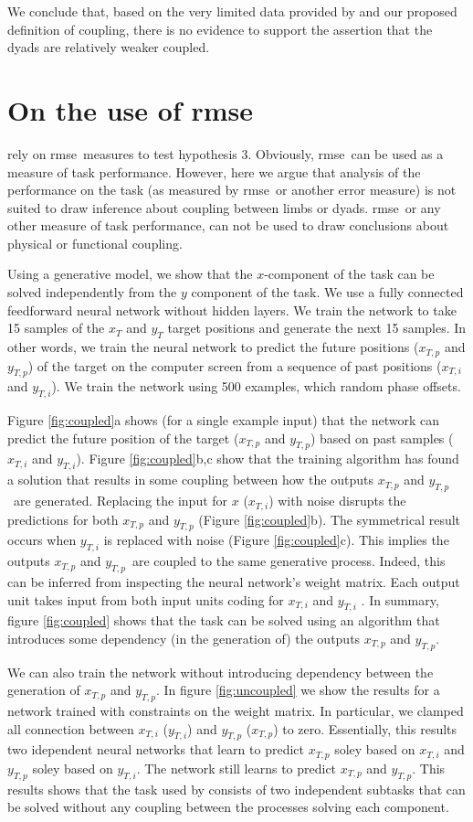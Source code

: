 \documentclass[11pt]{article}
\newcommand{\rmse}{\gls{rmse}}
\newcommand{\xt}{x_{T}}
\newcommand{\yt}{y_{T}}
\newcommand{\xti}{x_{T,i}}
\newcommand{\yti}{y_{T,i}}
\newcommand{\xto}{x_{T,p}}
\newcommand{\yto}{y_{T,p}}
\newcommand{\nnin}{$\xti$ and $\yti$}
\newcommand{\nnout}{$\xto$ and $\yto$}
\begin{document}
We conclude that, based on the very limited data provided by \citet{Annand2020} and our proposed definition of coupling, there is no evidence to support the assertion that the dyads are relatively weaker coupled.

\section{On the use of \rmse}

\citet{Annand2020} rely on \rmse\ measures to test hypothesis 3. Obviously, \rmse\ can be used as a measure of task performance. However, here we argue that analysis of the performance on the task (as measured by \rmse\ or another error measure) is not suited to draw inference about coupling between limbs or dyads. \rmse\, or any other measure of task performance, can not be used to draw conclusions about physical or functional coupling.

Using a generative model, we show that the $x$-component of the task can be solved independently from the $y$ component of the task. We use a fully connected feedforward neural network without hidden layers. We train the network to take 15 samples of the $\xt$ and $\yt$ target positions and generate the next 15 samples. In other words, we train the neural network to predict the future positions (\nnout) of the target on the computer screen from a sequence of past positions (\nnin). We train the network using 500 examples, which random phase offsets.

Figure \ref{fig:coupled}a shows (for a single example input) that the network can predict the future position of the target (\nnout) based on past samples (\nnin). Figure \ref{fig:coupled}b,c show that the training algorithm has found a solution that results in some coupling between how the outputs \nnout\ are generated. Replacing the input for $x$ ($\xti$) with noise disrupts the predictions for both $\xto$ and $\yto$ (Figure \ref{fig:coupled}b). The symmetrical result occurs when $\yti$ is replaced with noise  (Figure \ref{fig:coupled}c). This implies the outputs \nnout\ are coupled to the same generative process. Indeed, this can be inferred from inspecting the neural network's weight matrix. Each output unit takes input from both input units coding for  $\xti$  and $\yti$ . In summary, figure \ref{fig:coupled} shows that the task can be solved using an algorithm that introduces some dependency (in the generation of) the outputs \nnout.

We can also train the network without introducing dependency between the generation of \nnout. In figure \ref{fig:uncoupled} we show the results for a network trained with constraints on the weight matrix. In particular, we clamped all connection between  $\xti$ ($\yti$) and $\yto$ ($\xto$) to zero. Essentially, this results two idependent neural networks that learn to predict $\xto$ soley based on $\xti$ and  $\yto$ soley based on $\yti$. The network still learns to predict \nnout. This results shows that the task used by \citet{Annand2020} consists of two independent subtasks that can be solved without any coupling between the processes solving each component.
\end{document}
